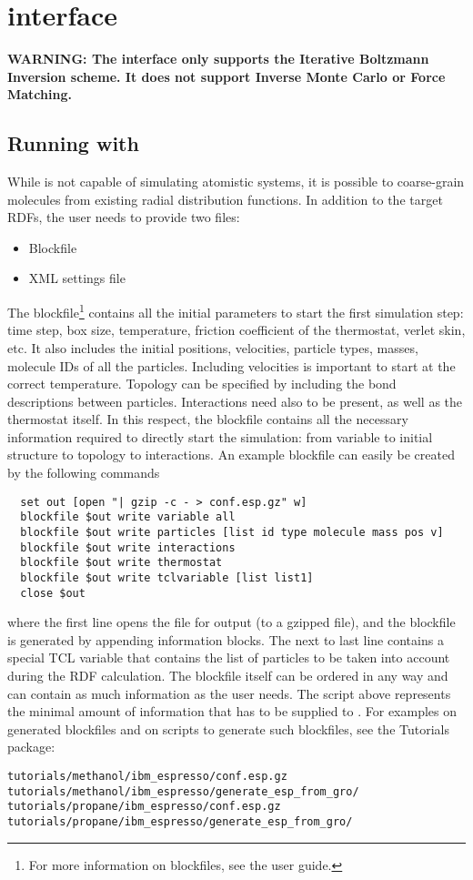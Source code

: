 \chapter{\espresso interface}
\label{sec:usage:espresso}
\textbf{WARNING: The \espresso interface only supports the Iterative Boltzmann
  Inversion scheme. It does not support Inverse Monte Carlo or Force Matching.}

\section{Running \ibi with \espresso}

While \espresso\cite{Limbach:2006} is not capable of simulating atomistic
systems, it is possible to coarse-grain molecules from existing radial
distribution functions. In addition to the target RDFs, the user needs to
provide two files:
\begin{itemize}
\item Blockfile
\item XML settings file
\end{itemize}

The blockfile\footnote{For more information on \espresso blockfiles, see the
  \espresso user guide.} contains all the initial \espresso parameters to
start the first simulation step: time step, box size, temperature, friction
coefficient of the thermostat, verlet skin, etc. It also includes the initial
positions, velocities, particle types, masses, molecule IDs of all the
particles. Including velocities is important to start at the correct
temperature. Topology can be specified by including the bond descriptions
between particles. Interactions need also to be present, as well as the
thermostat itself. In this respect, the blockfile contains all the necessary
information required to directly start the simulation: from \espresso variable
to initial structure to topology to interactions. An example blockfile can
easily be created by the following commands
\begin{verbatim}
  set out [open "| gzip -c - > conf.esp.gz" w]
  blockfile $out write variable all
  blockfile $out write particles [list id type molecule mass pos v]
  blockfile $out write interactions
  blockfile $out write thermostat
  blockfile $out write tclvariable [list list1]
  close $out
\end{verbatim}
where the first line opens the file for output (to a gzipped file), and the
blockfile is generated by appending information blocks. The next to last line
contains a special TCL variable that contains the list of particles to be
taken into account during the RDF calculation. The blockfile itself can be
ordered in any way and can contain as much information as the user
needs. The script above represents the minimal amount of information that has
to be supplied to \votca. For examples on generated blockfiles and on scripts
to generate such blockfiles, see the Tutorials package:
\begin{verbatim}
tutorials/methanol/ibm_espresso/conf.esp.gz
tutorials/methanol/ibm_espresso/generate_esp_from_gro/
tutorials/propane/ibm_espresso/conf.esp.gz
tutorials/propane/ibm_espresso/generate_esp_from_gro/
\end{verbatim}

